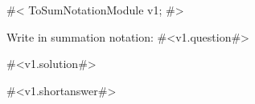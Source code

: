 

#<
ToSumNotationModule v1;
#>

Write in summation notation: #<v1.question#>

#<v1.solution#> 

#<v1.shortanswer#>



